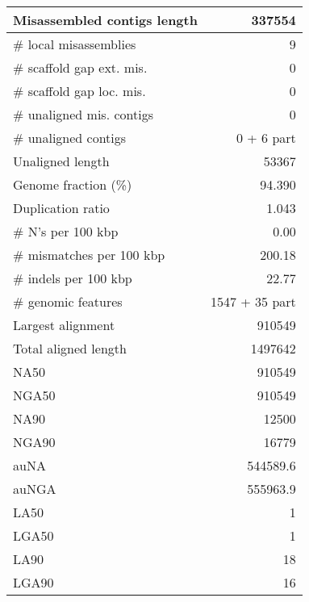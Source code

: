 \documentclass[12pt,a4paper]{article}
\begin{document}
\begin{table}[ht]
\begin{center}
\begin{tabular}{|l*{1}{|r}|}
Misassembled contigs length & 337554 \\ \hline
\# local misassemblies & 9 \\ \hline
\# scaffold gap ext. mis. & 0 \\ \hline
\# scaffold gap loc. mis. & 0 \\ \hline
\# unaligned mis. contigs & 0 \\ \hline
\# unaligned contigs & 0 + 6 part \\ \hline
Unaligned length & 53367 \\ \hline
Genome fraction (\%) & 94.390 \\ \hline
Duplication ratio & 1.043 \\ \hline
\# N's per 100 kbp & 0.00 \\ \hline
\# mismatches per 100 kbp & 200.18 \\ \hline
\# indels per 100 kbp & 22.77 \\ \hline
\# genomic features & 1547 + 35 part \\ \hline
Largest alignment & 910549 \\ \hline
Total aligned length & 1497642 \\ \hline
NA50 & 910549 \\ \hline
NGA50 & 910549 \\ \hline
NA90 & 12500 \\ \hline
NGA90 & 16779 \\ \hline
auNA & 544589.6 \\ \hline
auNGA & 555963.9 \\ \hline
LA50 & 1 \\ \hline
LGA50 & 1 \\ \hline
LA90 & 18 \\ \hline
LGA90 & 16 \\ \hline
\end{tabular}
\end{center}
\end{table}
\end{document}
